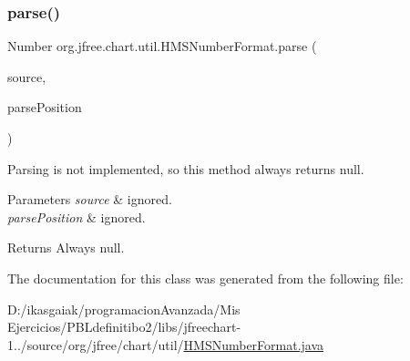 \subsubsection{\texorpdfstring{parse()}{parse()}}
{\footnotesize\ttfamily Number org.\+jfree.\+chart.\+util.\+H\+M\+S\+Number\+Format.\+parse (\begin{DoxyParamCaption}\item[{String}]{source,  }\item[{Parse\+Position}]{parse\+Position }\end{DoxyParamCaption})}

Parsing is not implemented, so this method always returns {\ttfamily null}.


\begin{DoxyParams}{Parameters}
{\em source} & ignored. \\
\hline
{\em parse\+Position} & ignored.\\
\hline
\end{DoxyParams}
\begin{DoxyReturn}{Returns}
Always {\ttfamily null}. 
\end{DoxyReturn}


The documentation for this class was generated from the following file\+:\begin{DoxyCompactItemize}
\item 
D\+:/ikasgaiak/programacion\+Avanzada/\+Mis Ejercicios/\+P\+B\+Ldefinitibo2/libs/jfreechart-\/1../source/org/jfree/chart/util/\mbox{\hyperlink{_h_m_s_number_format_8java}{H\+M\+S\+Number\+Format.\+java}}\end{DoxyCompactItemize}
